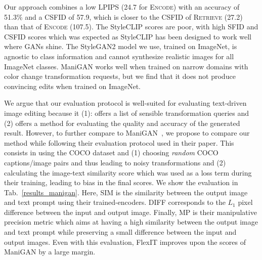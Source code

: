 Our \ours approach  combines a  low \ac{LPIPS} (24.7  for \textsc{Encode}) with an 
accuracy of 51.3\% and a \ac{CSFID} of 57.9, which is closer to the \ac{CSFID} of
\textsc{Retrieve} (27.2) than that of \textsc{Encode} (107.5).
The StyleCLIP scores are poor, with high \ac{SFID} and \ac{CSFID} scores which was expected as 
StyleCLIP has been designed to work well where GANs shine.
The StyleGAN2 model we use, trained on ImageNet, is agnostic to class information and 
cannot synthesize realistic images for all ImageNet classes.
ManiGAN works well when trained on narrow domains with color change transformation 
requests, but we find that it does not produce convincing edits when trained on 
ImageNet.


We argue that our evaluation protocol is well-suited for evaluating text-driven image editing because it 
(1): offers a list of sensible transformation queries and (2) offers a method for evaluating the quality and accuracy 
of the generated result. However, to further compare to ManiGAN~\citep{li2020manigan}, we propose to compare our method 
while following their 
evaluation protocol used in their paper. This consists in using the COCO dataset and (1) choosing 
\textit{random} COCO captions/image pairs and thus leading to noisy transformations and (2) calculating the image-text similarity
 score which was used as a loss term during their training, leading to bias in the final scores. 
 We show the evaluation
 in Tab.~\ref{results_manigan}.
 Here, SIM  is the similarity between the output image and text prompt using their trained-encoders. DIFF corresponds to the $L_1$ pixel 
 difference between the input and output image. Finally, MP is their manipulative precision 
 metric which aims at having a high similarity between the output image and text prompt while preserving a small difference between the input and output images.
 Even with this evaluation, FlexIT improves upon the scores of ManiGAN by a large margin.


